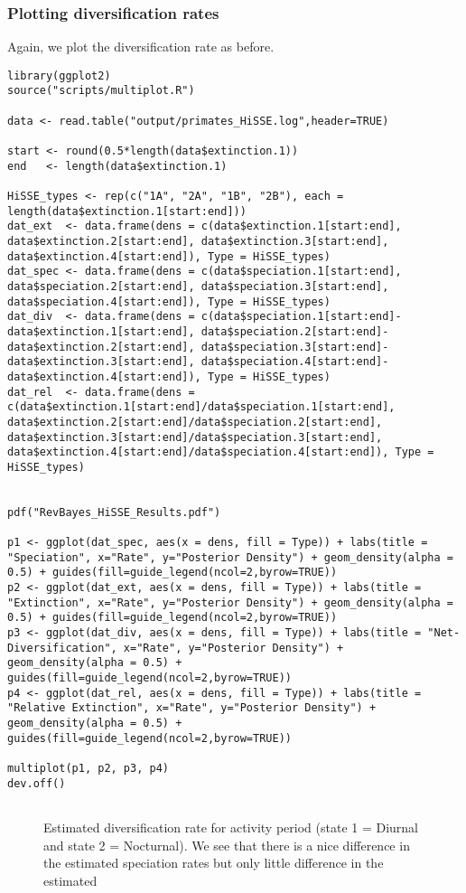 \subsubsection{Plotting diversification rates}
Again, we plot the diversification rate as before.
{\tt \begin{snugshade*}
\begin{lstlisting}
library(ggplot2)
source("scripts/multiplot.R")

data <- read.table("output/primates_HiSSE.log",header=TRUE)

start <- round(0.5*length(data$extinction.1))
end   <- length(data$extinction.1)

HiSSE_types <- rep(c("1A", "2A", "1B", "2B"), each = length(data$extinction.1[start:end]))
dat_ext  <- data.frame(dens = c(data$extinction.1[start:end], data$extinction.2[start:end], data$extinction.3[start:end], data$extinction.4[start:end]), Type = HiSSE_types)
dat_spec <- data.frame(dens = c(data$speciation.1[start:end], data$speciation.2[start:end], data$speciation.3[start:end], data$speciation.4[start:end]), Type = HiSSE_types)
dat_div  <- data.frame(dens = c(data$speciation.1[start:end]-data$extinction.1[start:end], data$speciation.2[start:end]-data$extinction.2[start:end], data$speciation.3[start:end]-data$extinction.3[start:end], data$speciation.4[start:end]-data$extinction.4[start:end]), Type = HiSSE_types)
dat_rel  <- data.frame(dens = c(data$extinction.1[start:end]/data$speciation.1[start:end], data$extinction.2[start:end]/data$speciation.2[start:end], data$extinction.3[start:end]/data$speciation.3[start:end], data$extinction.4[start:end]/data$speciation.4[start:end]), Type = HiSSE_types)


pdf("RevBayes_HiSSE_Results.pdf")

p1 <- ggplot(dat_spec, aes(x = dens, fill = Type)) + labs(title = "Speciation", x="Rate", y="Posterior Density") + geom_density(alpha = 0.5) + guides(fill=guide_legend(ncol=2,byrow=TRUE))
p2 <- ggplot(dat_ext, aes(x = dens, fill = Type)) + labs(title = "Extinction", x="Rate", y="Posterior Density") + geom_density(alpha = 0.5) + guides(fill=guide_legend(ncol=2,byrow=TRUE))
p3 <- ggplot(dat_div, aes(x = dens, fill = Type)) + labs(title = "Net-Diversification", x="Rate", y="Posterior Density") + geom_density(alpha = 0.5) + guides(fill=guide_legend(ncol=2,byrow=TRUE))
p4 <- ggplot(dat_rel, aes(x = dens, fill = Type)) + labs(title = "Relative Extinction", x="Rate", y="Posterior Density") + geom_density(alpha = 0.5) + guides(fill=guide_legend(ncol=2,byrow=TRUE))

multiplot(p1, p2, p3, p4)
dev.off()


\end{lstlisting}
\end{snugshade*}}
\begin{figure}[h!]
\centering
{}
\caption{\small Estimated diversification rate for activity period (state 1 = Diurnal and state 2 = Nocturnal). We see that there is a nice difference in the estimated speciation rates but only little difference in the estimated}
\label{fig:anc_states_BiSSE}
\end{figure}


